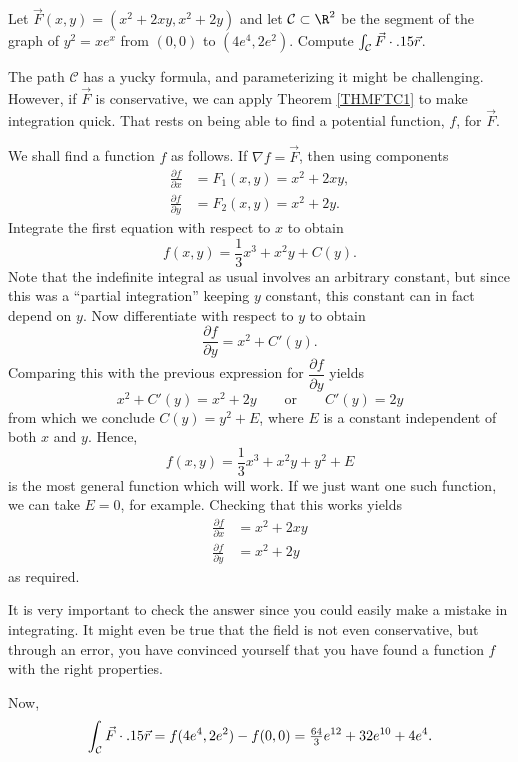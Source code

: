 \begin{example}
	Let $\vec F(x,y)=(x^2+2xy,x^2+2y)$ and let $\mathcal C\subset\R^2$ be the
	segment of the graph of $y^2=xe^x$ from $(0,0)$ to $(4e^4,2e^2)$.  Compute $\int_{\mathcal C}\vec F\cdot .15 \vec r$.

	The path $\mathcal C$ has a yucky formula, and parameterizing it might be challenging.
	However, if $\vec F$ is conservative, we can apply Theorem \ref{THMFTC1}
	to make integration quick.  That rests on being able to find a potential function, $f$,
	for $\vec F$.

	We shall find a function $f$ as follows.
	If $\nabla f = \vec F$, then using components
	\begin{align*}
	   \frac{\partial f}{\partial x} &= F_1(x,y) = x^2 + 2xy, \\
	   \frac{\partial f}{\partial y} &= F_2(x,y) = x^2 + 2y.
	\end{align*}
	Integrate the first equation with respect to $x$ to obtain
	\[
	  f(x,y) = \frac 13 x^3 + x^2y + C(y).
	\]
	Note that the indefinite integral as usual involves an arbitrary
	constant, but since this was a ``partial integration'' keeping $y$
	constant, this constant can in fact depend on $y$.   Now differentiate
	with respect to $y$ to obtain
	\[
	\frac{\partial f}{\partial y} = x^2 + C'(y).
	\]
	Comparing this with the previous expression for $\dfrac{\partial f}
	{\partial y}$ yields
	\[
	  x^2 + C'(y) = x^2  + 2y\qquad\text{or}\qquad C'(y) = 2y
	\]
	from which we conclude $C(y) = y^2 + E$, where $E$ is a constant 
	independent of both $x$ and $y$.  Hence,
	\[
	f(x,y) = \frac 13 x^3 + x^2y + y^2 + E
	\]
	is the most general function which will work.  If we
	just want one such function, we can take $E = 0$, for example.
	Checking that this works yields
	\begin{align*}
	\frac{\partial f}{\partial x} &= x^2 + 2xy \\
	\frac{\partial f}{\partial y} &= x^2 + 2y 
	\end{align*}
	as required.

	It is very important to check the answer since you could easily
	make a mistake in integrating.  It might even be true that the
	field is not even conservative, but through an error, you have convinced
	yourself that you have found a function $f$ with the right
	properties.

	Now, 
	\[
		\int_{\mathcal C}\vec F\cdot .15 \vec r
		= f(4e^4,2e^2) - f(0,0) = \tfrac{64}{3}e^{12}+32e^{10}+4e^4.
	\]
\end{example}

